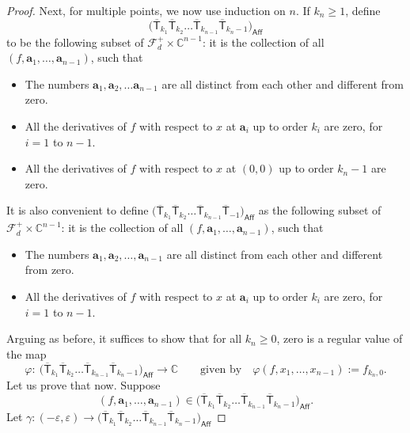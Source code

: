 \documentclass[pdftex]{sigma}
\numberwithin{equation}{section}
\begin{document}
\begin{proof}
Next, for multiple points, we now use induction on
$n$. If $k_n \geq 1$, define
\[\bigl(\overline{\mathsf{T}}_{k_1} \overline{\mathsf{T}}_{k_2}
\dots \overline{\mathsf{T}}_{k_{n-1}} \overline{\mathsf{T}}_{k_{n}-1}\bigr)_{\mathsf{Aff}}
\]
to be the following subset of $\mathcal{F}_d^{+} \times \mathbb{C}^{n-1}$: it is
the collection of all $(f, \mathbf{a}_1, \dots, \mathbf{a}_{n-1})$, such that
\begin{itemize}\itemsep=0pt
\item The numbers
$\mathbf{a}_1, \mathbf{a}_2, \dots \mathbf{a}_{n-1}$ are all distinct
from each other and different from zero.
\item All the derivatives of $f$ with respect to $x$
at $\mathbf{a}_i$ up to order $k_i$ are zero, for $i=1$ to $n-1$.
\item All the derivatives of $f$ with respect to $x$
at $(0, 0)$ up to order $k_n-1$ are zero.
\end{itemize}
It is also convenient to define
$\bigl(\overline{\mathsf{T}}_{k_1} \overline{\mathsf{T}}_{k_2}
\dots \overline{\mathsf{T}}_{k_{n-1}} \overline{\mathsf{T}}_{-1}\bigr)_{\mathsf{Aff}}$
as the following subset of $\mathcal{F}_d^{+} \times \mathbb{C}^{n-1}$: it is
the collection of all $(f, \mathbf{a}_1, \dots, \mathbf{a}_{n-1})$, such that
\begin{itemize}\itemsep=0pt
\item The numbers
$\mathbf{a}_1, \mathbf{a}_2, \dots , \mathbf{a}_{n-1}$ are all distinct
from each other and different from zero.
\item All the derivatives of $f$ with respect to $x$
at $\mathbf{a}_i$ up to order $k_i$ are zero, for $i=1$ to $n-1$.
\end{itemize}
Arguing as before,
it suffices to show that for all $k_n \geq 0$, zero is a regular value of the map
\[\varphi \colon\ \bigl(\overline{\mathsf{T}}_{k_1} \overline{\mathsf{T}}_{k_2}
\dots \overline{\mathsf{T}}_{k_{n-1}} \overline{\mathsf{T}}_{k_{n}-1}\bigr)_{\mathsf{Aff}}
 \longrightarrow \mathbb{C} \qquad \text{given by}
\quad \varphi(f, x_1, \dots, x_{n-1}) := f_{k_n, 0}. \]
Let us prove that now. Suppose
\[(f,\mathbf{a}_1, \dots, \mathbf{a}_{n-1})
\in \bigl(\overline{\mathsf{T}}_{k_1} \overline{\mathsf{T}}_{k_2}
\dots \overline{\mathsf{T}}_{k_{n-1}} \overline{\mathsf{T}}_{k_{n}-1}\bigr)_{\mathsf{Aff}}.\]
Let $\gamma\colon(-\varepsilon, \varepsilon)\longrightarrow
\bigl(\overline{\mathsf{T}}_{k_1} \overline{\mathsf{T}}_{k_2}
\dots \overline{\mathsf{T}}_{k_{n-1}} \overline{\mathsf{T}}_{k_{n}-1}\bigr)_{\mathsf{Aff}}$

\end{proof}
\end{document}
